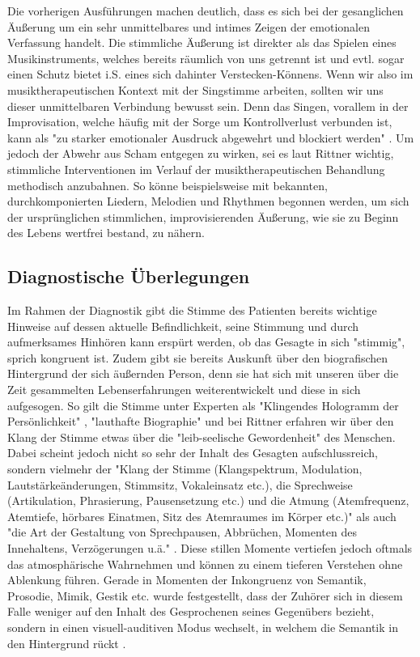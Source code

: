 Die vorherigen Ausführungen machen deutlich, dass es sich bei der gesanglichen Äußerung um ein sehr unmittelbares und intimes Zeigen der emotionalen Verfassung handelt. Die stimmliche Äußerung ist direkter als das Spielen eines Musikinstruments, welches bereits räumlich von uns getrennt ist und evtl. sogar einen Schutz bietet i.S. eines sich dahinter Verstecken-Könnens. Wenn wir also im musiktherapeutischen Kontext mit der Singstimme arbeiten, sollten wir uns dieser unmittelbaren Verbindung bewusst sein. Denn das Singen, vorallem in der Improvisation, welche häufig mit der Sorge um Kontrollverlust verbunden ist, kann als "zu starker emotionaler Ausdruck abgewehrt und blockiert werden" \autocite[485]{rittner2009a}. Um jedoch der Abwehr aus Scham entgegen zu wirken, sei es laut Rittner wichtig, stimmliche Interventionen im Verlauf der musiktherapeutischen Behandlung methodisch anzubahnen. So könne beispielsweise mit bekannten, durchkomponierten Liedern, Melodien und Rhythmen begonnen werden, um sich der ursprünglichen stimmlichen, improvisierenden Äußerung, wie sie zu Beginn des Lebens wertfrei bestand, zu nähern. 

\subsection{Diagnostische Überlegungen}
Im Rahmen der Diagnostik gibt die Stimme des Patienten bereits wichtige Hinweise auf dessen aktuelle Befindlichkeit, seine Stimmung und durch aufmerksames Hinhören kann erspürt werden, ob das Gesagte in sich "stimmig", sprich kongruent ist. Zudem gibt sie bereits Auskunft über den biografischen Hintergrund der sich äußernden Person, denn sie hat sich mit unseren über die Zeit gesammelten Lebenserfahrungen weiterentwickelt und diese in sich aufgesogen. So gilt die Stimme unter Experten als "Klingendes Hologramm der Persönlichkeit" \autocite{adamek1999}, "lauthafte Biographie" \autocite{gundermann1994} und bei Rittner erfahren wir über den Klang der Stimme etwas über die "leib-seelische Gewordenheit" \autocite[211]{rittner2008} des Menschen.
Dabei scheint jedoch nicht so sehr der Inhalt des Gesagten aufschlussreich, sondern vielmehr der "Klang der Stimme (Klangspektrum, Modulation, Lautstärkeänderungen, Stimmsitz, Vokaleinsatz etc.), die Sprechweise (Artikulation, Phrasierung, Pausensetzung etc.) und die Atmung (Atemfrequenz, Atemtiefe, hörbares Einatmen, Sitz des Atemraumes im Körper etc.)" als auch "die Art der Gestaltung von Sprechpausen, Abbrüchen, Momenten des Innehaltens, Verzögerungen u.ä." \autocite[210]{rittner2008}. Diese stillen Momente vertiefen jedoch oftmals das atmosphärische Wahrnehmen und können zu einem tieferen Verstehen ohne Ablenkung führen. 
Gerade in Momenten der Inkongruenz von Semantik, Prosodie, Mimik, Gestik etc. wurde festgestellt, dass der Zuhörer sich in diesem Falle weniger auf den Inhalt des Gesprochenen seines Gegenübers bezieht, sondern in einen visuell-auditiven Modus wechselt, in welchem die Semantik in den Hintergrund rückt \autocite [vgl.][206f.]{rittner2008}.

